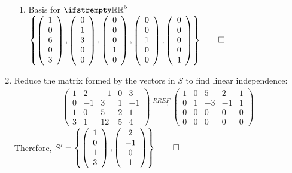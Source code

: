 \documentclass[12pt, a4paper]{article}
\begin{document}
\begin{enumerate}[Q\arabic*.]
\begin{enumerate}[(\alph*)]
      \item Basis for $\RR^5$ = $\left\{ \left(\begin{array}{c} 1\\ 0\\ 6\\ 0\\ 3 \end{array}\right), \left(\begin{array}{c} 0\\ 1\\ 3\\ 0\\ 0 \end{array}\right), \left(\begin{array}{c} 0\\ 0\\ 0\\ 1\\ 0 \end{array}\right), \left(\begin{array}{c} 0\\ 0\\ 1\\ 0\\ 0 \end{array}\right), \left(\begin{array}{c} 0\\ 0\\ 0\\ 0\\ 1 \end{array}\right)\right\} \qed$ 
    \end{enumerate}

  \item Reduce the matrix formed by the vectors in $S$ to find linear independence:
    \begin{align*}
      \left(\begin{array}{ccccc} 1 & 2 & -1 & 0 & 3\\ 0 & -1 & 3 & 1 & -1\\ 1 & 0 & 5 & 2 & 1\\ 3 & 1 & 12 & 5 & 4 \end{array}\right)
      \xrightarrow{RREF}
      \left(\begin{array}{ccccc} 1 & 0 & 5 & 2 & 1\\ 0 & 1 & -3 & -1 & 1\\ 0 & 0 & 0 & 0 & 0\\ 0 & 0 & 0 & 0 & 0 \end{array}\right)
    \end{align*}
    Therefore, $S'=\left\{\left(\begin{array}{c} 1\\ 0\\ 1\\ 3 \end{array}\right), \left(\begin{array}{c} 2\\ -1\\ 0\\ 1 \end{array}\right)\right\} \qed$
\end{enumerate}
\end{document}
